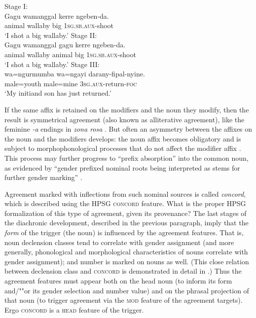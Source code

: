 \documentclass[output=paper
	        ,collection
	        ,collectionchapter
 	        ,biblatex
                ,babelshorthands
                ,newtxmath
                ,draftmode
                ,colorlinks, citecolor=brown
]{langscibook}
\begin{document}
\begin{exe}
\ex
\begin{xlist}
\ex \label{wallaby1} Stage I: \\
\gll 	Gagu	   wamanggal	  kerre    ngeben-da. \\
	     animal	wallaby	      big	      1\textsc{sg.sb.aux}-shoot \\
\glt `I shot a big wallaby.’	
\ex \label{wallaby2} Stage II: \\
\gll 	Gagu	   wamanggal	   gagu	kerre	    ngeben-da. \\
	animal	wallaby	  animal     	big	1\textsc{sg.sb.aux}-shoot\\
\glt `I shot a big wallaby.’
\ex \label{wallaby3} Stage III: \\
\gll 	wa=ngurmumba	wa=ngayi	darany-fipal-nyine. \\
	male=youth		male=mine	\textsc{3sg.aux}-return-\textsc{foc} \\
\glt 	`My initiand son has just returned.’ 
\end{xlist}
\end{exe}

\noindent
If the same affix is retained on the modifiers and the noun they modify, then the result is symmetrical agreement (also known as alliterative agreement), like the feminine \textit{-a} endings in  \textit{zona rosa} \citep[87--88]{corbett:2006}.  But often an asymmetry between the affixes on the  noun and the modifiers develops: the noun affix becomes obligatory and is subject to morphophonological processes that do not affect the modifier affix \citep[216]{reid:1997}.    This process may further progress to ``prefix absorption'' into the common noun, as evidenced by ``gender prefixed nominal roots being interpreted as stems for further gender marking'' \citep[217]{reid:1997}.


Agreement marked with inflections from such nominal sources is called \emph{concord}, which is described using the HPSG \textsc{concord} feature.  What is the proper HPSG formalization of this type of agreement, given its provenance?   The last stages of the diachronic development, described in the previous paragraph, imply that the \textit{form} of the trigger (the noun) is influenced by the agreement features.  That is, noun declension classes tend to correlate with gender assignment (and more generally, phonological and morphological characteristics of nouns correlate with gender assignment); and number is marked on nouns as well.  (This close relation between declension class and \textsc{concord} is demonstrated in detail in \citealt[Chapter~2]{Wechsler+Zlatic:2003}.) Thus the agreement features must appear both on the head noun (to inform its form and/""or its gender selection and number value) and on the phrasal projection of that noun (to trigger agreement via the \textsc{mod} feature of the agreement targets).  Ergo \textsc{concord} is a \textsc{head} feature of the trigger.  
\end{document}
